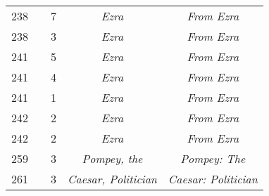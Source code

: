 \documentclass[a4paper,11pt]{article}
\begin{document}
\begin{center}
\begin{tabular}{|c|c|c|c|c|}
    238 & & \hphantom{0}7 & \textit{Ezra} & \textit{From Ezra} \\
    238 & & \hphantom{0}3 & \textit{Ezra} & \textit{From Ezra} \\
    241 & & \hphantom{0}5 & \textit{Ezra} & \textit{From Ezra} \\
    241 & & \hphantom{0}4 & \textit{Ezra} & \textit{From Ezra} \\
    241 & & \hphantom{0}1 & \textit{Ezra} & \textit{From Ezra} \\
    242 & & \hphantom{0}2 & \textit{Ezra} & \textit{From Ezra} \\
    242 & & \hphantom{0}2 & \textit{Ezra} & \textit{From Ezra} \\
    259 & & \hphantom{0}3 & \textit{Pompey, the} & \textit{Pompey: The} \\
    261 & & \hphantom{0}3 & \textit{Caesar, Politician}
           & \textit{Caesar: Politician} \\
    \hline
  \end{tabular}





  \newpage


\end{center}
\end{document}
